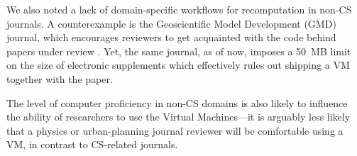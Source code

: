 We also noted a lack of domain-specific workflows for recomputation in non-CS journals.
A counterexample is the Geoscientific Model Development (GMD) journal, which encourages reviewers to get
  acquainted with the code behind papers under review \cite{GMD_editorial_2013}.
Yet, the same journal, as of now, imposes a 50~MB limit on the size of electronic supplements 
  which effectively rules out shipping a VM together with the paper.

The level of computer proficiency in non-CS domains \citep[see discussion by]{Merali_2010} is also likely to influence the ability of researchers to use the Virtual Machines---it is arguably less likely that a physics or urban-planning journal reviewer will be comfortable using a VM, in contrast to CS-related journals.
